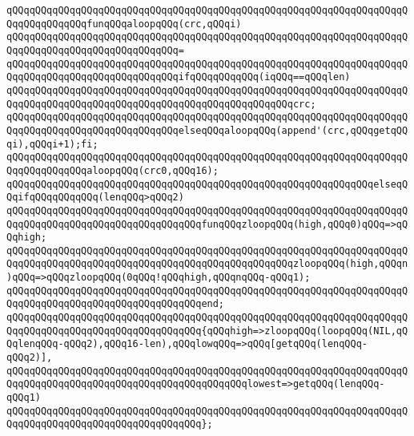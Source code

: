 \verb|qQQqqQQqqQQqqQQqqQQqqQQqqQQqqQQqqQQqqQQqqQQqqQQqqQQqqQQqqQQqqQQqqQQqqQQqqQQqqQQqqQQqfunqQQqaloopqQQq(crc,qQQqi)|\newline
\verb|qQQqqQQqqQQqqQQqqQQqqQQqqQQqqQQqqQQqqQQqqQQqqQQqqQQqqQQqqQQqqQQqqQQqqQQqqQQqqQQqqQQqqQQqqQQqqQQqqQQq=|\newline
\verb|qQQqqQQqqQQqqQQqqQQqqQQqqQQqqQQqqQQqqQQqqQQqqQQqqQQqqQQqqQQqqQQqqQQqqQQqqQQqqQQqqQQqqQQqqQQqqQQqqQQqifqQQqqQQqqQQq(iqQQq==qQQqlen)|\newline
\verb|qQQqqQQqqQQqqQQqqQQqqQQqqQQqqQQqqQQqqQQqqQQqqQQqqQQqqQQqqQQqqQQqqQQqqQQqqQQqqQQqqQQqqQQqqQQqqQQqqQQqqQQqqQQqqQQqqQQqqQQqcrc;|\newline
\verb|qQQqqQQqqQQqqQQqqQQqqQQqqQQqqQQqqQQqqQQqqQQqqQQqqQQqqQQqqQQqqQQqqQQqqQQqqQQqqQQqqQQqqQQqqQQqqQQqqQQqelseqQQqaloopqQQq(append'(crc,qQQqgetqQQqi),qQQqi+1);fi;|\newline
\newline
\verb|qQQqqQQqqQQqqQQqqQQqqQQqqQQqqQQqqQQqqQQqqQQqqQQqqQQqqQQqqQQqqQQqqQQqqQQqqQQqqQQqqQQqaloopqQQq(crc0,qQQq16);|\newline
\newline
\verb|qQQqqQQqqQQqqQQqqQQqqQQqqQQqqQQqqQQqqQQqqQQqqQQqqQQqqQQqqQQqqQQqelseqQQqifqQQqqQQqqQQq(lenqQQq>qQQq2)|\newline
\newline
\verb|qQQqqQQqqQQqqQQqqQQqqQQqqQQqqQQqqQQqqQQqqQQqqQQqqQQqqQQqqQQqqQQqqQQqqQQqqQQqqQQqqQQqqQQqqQQqqQQqqQQqqQQqfunqQQqzloopqQQq(high,qQQq0)qQQq=>qQQqhigh;|\newline
\verb|qQQqqQQqqQQqqQQqqQQqqQQqqQQqqQQqqQQqqQQqqQQqqQQqqQQqqQQqqQQqqQQqqQQqqQQqqQQqqQQqqQQqqQQqqQQqqQQqqQQqqQQqqQQqqQQqqQQqqQQqzloopqQQq(high,qQQqn)qQQq=>qQQqzloopqQQq(0qQQq!qQQqhigh,qQQqnqQQq-qQQq1);|\newline
\verb|qQQqqQQqqQQqqQQqqQQqqQQqqQQqqQQqqQQqqQQqqQQqqQQqqQQqqQQqqQQqqQQqqQQqqQQqqQQqqQQqqQQqqQQqqQQqqQQqqQQqqQQqend;|\newline
\newline
\verb|qQQqqQQqqQQqqQQqqQQqqQQqqQQqqQQqqQQqqQQqqQQqqQQqqQQqqQQqqQQqqQQqqQQqqQQqqQQqqQQqqQQqqQQqqQQqqQQqqQQqqQQq{qQQqhigh=>zloopqQQq(loopqQQq(NIL,qQQqlenqQQq-qQQq2),qQQq16-len),qQQqlowqQQq=>qQQq[getqQQq(lenqQQq-qQQq2)],|\newline
\verb|qQQqqQQqqQQqqQQqqQQqqQQqqQQqqQQqqQQqqQQqqQQqqQQqqQQqqQQqqQQqqQQqqQQqqQQqqQQqqQQqqQQqqQQqqQQqqQQqqQQqqQQqqQQqqQQqlowest=>getqQQq(lenqQQq-qQQq1)|\newline
\verb|qQQqqQQqqQQqqQQqqQQqqQQqqQQqqQQqqQQqqQQqqQQqqQQqqQQqqQQqqQQqqQQqqQQqqQQqqQQqqQQqqQQqqQQqqQQqqQQqqQQqqQQq};|\newline
